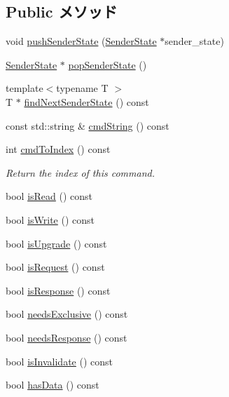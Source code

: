 \subsection*{Public メソッド}
\begin{DoxyCompactItemize}
\item 
void \hyperlink{classPacket_a6a6aa11d6c2aec2df5aafeefe2847d8e}{pushSenderState} (\hyperlink{structPacket_1_1SenderState}{SenderState} $\ast$sender\_\-state)
\item 
\hyperlink{structPacket_1_1SenderState}{SenderState} $\ast$ \hyperlink{classPacket_a6f73d3ef605e592952b5586975161bfd}{popSenderState} ()
\item 
{\footnotesize template$<$typename T $>$ }\\T $\ast$ \hyperlink{classPacket_a55ab7685d5e3c590ee23ca4ec7c3c0a0}{findNextSenderState} () const 
\item 
const std::string \& \hyperlink{classPacket_a863af57e28a01258236ea303155fc7ff}{cmdString} () const 
\item 
int \hyperlink{classPacket_a8db75870e65b9d86793f2805097c05a0}{cmdToIndex} () const 
\begin{DoxyCompactList}\small\item\em Return the index of this command. \item\end{DoxyCompactList}\item 
bool \hyperlink{classPacket_adc47901747fc3c447db3abddaf01491a}{isRead} () const 
\item 
bool \hyperlink{classPacket_ab699d2f0d186312531fd1c279fd27b73}{isWrite} () const 
\item 
bool \hyperlink{classPacket_aadb2fde0aba4a65b45d591e9ef5b6a63}{isUpgrade} () const 
\item 
bool \hyperlink{classPacket_af21986d725d75fa8e1b6c83457cd4501}{isRequest} () const 
\item 
bool \hyperlink{classPacket_a5f89a108755a6cb3e8185d85c850a816}{isResponse} () const 
\item 
bool \hyperlink{classPacket_aa8e449288b878ff3ff7f286eb4d28b6a}{needsExclusive} () const 
\item 
bool \hyperlink{classPacket_a390c6cced05593f0a2c75a38a7a24fa9}{needsResponse} () const 
\item 
bool \hyperlink{classPacket_a4a1a39b8ffab2d6266cd9d794ca332e3}{isInvalidate} () const 
\item 
bool \hyperlink{classPacket_a0effbd4cf91891700ac41e86defe4aa6}{hasData} () const 
\item 

\end{DoxyCompactItemize}
